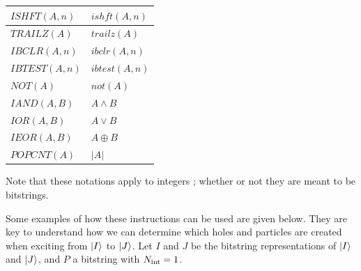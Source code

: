 \begin{table}[H]
	\begin{tabularx}{\textwidth}{X|X}
		\hline
		
		\hline
		\rule{0pt}{3ex}
		$ISHFT(A,n)$ & $ishft(A,n)$  \\ 
		
		\hline
		\rule{0pt}{3ex}
		$TRAILZ(A)$ & $trailz(A)$  \\ 
		
		\hline
		\rule{0pt}{3ex}
		$IBCLR(A,n)$ & $ibclr(A,n)$  \\ 
		
		\hline
		\rule{0pt}{3ex}
		$IBTEST(A,n)$ & $ibtest(A,n)$  \\ 
		
		\hline
		\rule{0pt}{3ex}
		$NOT(A)$ & $not(A)$  \\ 
		
		\hline
		\rule{0pt}{3ex}
		$IAND(A,B)$ & $A \wedge B$ \\
		
		\hline
		\rule{0pt}{3ex}
		$IOR(A,B)$ & $A \vee B$ \\
		
		\hline
		\rule{0pt}{3ex}
		$IEOR(A,B)$ & $A \oplus B$ \\
		
		\hline
		\rule{0pt}{3ex}
		$POPCNT(A)$ & $|A|$ \\
	\end{tabularx}
\end{table}

Note that these notations apply to integers ; whether or not they are meant to be bitstrings.



       
Some examples of how these instructions can be used are given below. They are key to understand how we can determine which holes and particles are created when exciting from $\ket I$ to $\ket J$.
Let $I$ and $J$ be the bitstring representations of $\ket I$ and $\ket J$, and $P$ a bitstring with ${N_\text{int}}=1$. 

      
      
